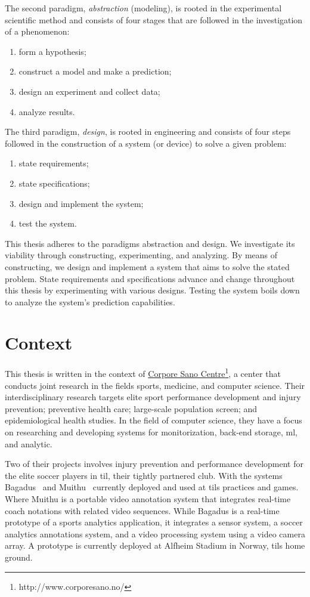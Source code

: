 The second paradigm, \emph{abstraction} (modeling), is rooted in the experimental scientific method and consists of four stages that are followed in the investigation of a phenomenon: 
\begin{enumerate}
    \item form a hypothesis;
    \item construct a model and make a prediction;
    \item design an experiment and collect data;
    \item analyze results.
\end{enumerate}

The third paradigm, \emph{design}, is rooted in engineering and consists of four steps followed in the construction of a system (or device) to solve a given problem:
\begin{enumerate}
    \item state requirements; 
    \item state specifications;
    \item design and implement the system;
    \item test the system.
\end{enumerate}

This thesis adheres to the paradigms abstraction and design. We investigate its viability through constructing, experimenting, and analyzing. By means of constructing, we design and implement a system that aims to solve the stated problem. State requirements and specifications advance and change throughout this thesis by experimenting with various designs. Testing the system boils down to analyze the system's prediction capabilities.

\section{Context}\label{sec:context}
This thesis is written in the context of \href{http://www.corporesano.no/}{Corpore Sano Centre}\footnote{http://www.corporesano.no/}, a center that conducts joint research in the fields sports, medicine, and computer science. Their interdisciplinary research targets elite sport performance development and injury prevention; preventive health care; large-scale population screen; and epidemiological health studies. In the field of computer science, they have a focus on researching and developing systems for monitorization, back-end storage, \ac{ml}, and analytic.

Two of their projects involves injury prevention and performance development for the elite soccer players in \ac{til}, their tightly partnered club. With the systems Bagadus~\cite{halvorsen2013bagadus} and Muithu~\cite{johansen2012muithu} currently deployed and used at \acp{til} practices and games. Where Muithu is a portable video annotation system that integrates real-time coach notations with related video sequences. While Bagadus is a real-time prototype of a sports analytics application, it integrates a sensor system, a soccer analytics annotations system, and a video processing system using a video camera array. A prototype is currently deployed at Alfheim Stadium in Norway, \acp{til} home ground.

